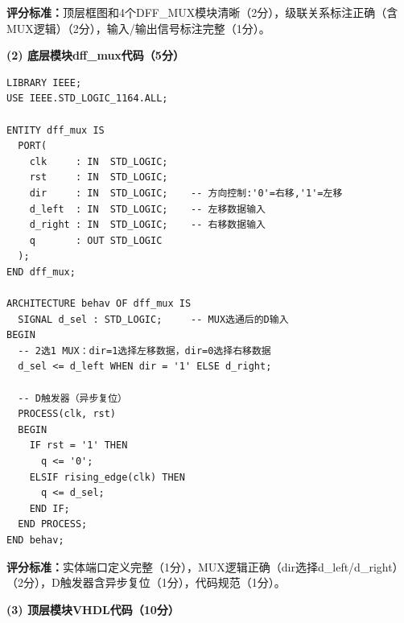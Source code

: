 \textbf{评分标准：}顶层框图和4个DFF\_MUX模块清晰（2分），级联关系标注正确（含MUX逻辑）（2分），输入/输出信号标注完整（1分）。

\vspace{0.3cm}

\textbf{(2) 底层模块dff\_mux代码（5分）}

\begin{lstlisting}[caption={dff\_mux底层模块VHDL代码}]
LIBRARY IEEE;
USE IEEE.STD_LOGIC_1164.ALL;

ENTITY dff_mux IS
  PORT(
    clk     : IN  STD_LOGIC;
    rst     : IN  STD_LOGIC;
    dir     : IN  STD_LOGIC;    -- 方向控制:'0'=右移,'1'=左移
    d_left  : IN  STD_LOGIC;    -- 左移数据输入
    d_right : IN  STD_LOGIC;    -- 右移数据输入
    q       : OUT STD_LOGIC
  );
END dff_mux;

ARCHITECTURE behav OF dff_mux IS
  SIGNAL d_sel : STD_LOGIC;     -- MUX选通后的D输入
BEGIN
  -- 2选1 MUX：dir=1选择左移数据，dir=0选择右移数据
  d_sel <= d_left WHEN dir = '1' ELSE d_right;

  -- D触发器（异步复位）
  PROCESS(clk, rst)
  BEGIN
    IF rst = '1' THEN
      q <= '0';
    ELSIF rising_edge(clk) THEN
      q <= d_sel;
    END IF;
  END PROCESS;
END behav;
\end{lstlisting}

\textbf{评分标准：}实体端口定义完整（1分），MUX逻辑正确（dir选择d\_left/d\_right）（2分），D触发器含异步复位（1分），代码规范（1分）。

\vspace{0.3cm}

\textbf{(3) 顶层模块VHDL代码（10分）}

